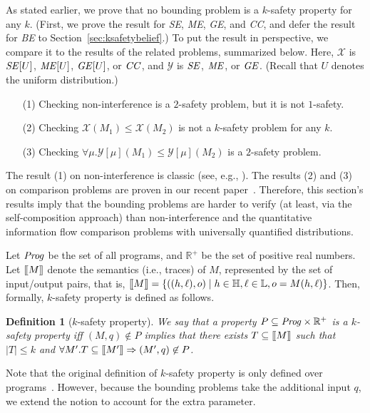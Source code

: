 \documentclass{llncs}
\newtheorem{definition}[theorem]{Definition}
\newcommand{\aset}[1]{\{{#1}\}}
\newcommand{\sembrack}[1]{[\hspace*{-1.2pt}[#1]\hspace*{-1.2pt}]}
\begin{document}
As stated earlier, we prove that no bounding problem is a $k$-safety
property for any $k$.  (First, we prove the result for {\it SE}, {\it
  ME}, {\it GE}, and {\it CC}, and defer the result for {\it BE} to
Section~\ref{sec:ksafetybelief}.)  To put the result in perspective, we
compare it to the results of the related problems, summarized below.
Here, $\mathcal{X}$ is ${\it SE}[U]$, ${\it ME}[U]$, ${\it GE}[U]$, or
${\it CC}$, and $\mathcal{Y}$ is ${\it SE}$, ${\it ME}$, or ${\it
  GE}$.  (Recall that $U$ denotes the uniform distribution.)
\begin{itemize}
\item[(1)] Checking non-interference is a $2$-safety problem, but it is not $1$-safety.
\item[(2)] Checking $\mathcal{X}(M_1) \leq \mathcal{X}(M_2)$ is not a $k$-safety problem for any $k$.
\item[(3)] Checking $\forall \mu.\mathcal{Y}[\mu](M_1) \leq \mathcal{Y}[\mu](M_2)$ is a $2$-safety problem.
\end{itemize}
The result (1) on non-interference is classic (see, e.g.,
\cite{mclean:sp94,barthe:csfw04,darvas:spc05}).  The results (2) and
(3) on comparison problems are proven in our recent
paper~\cite{DBLP:conf/csfw/yasuoka2010}.  Therefore, this section's
results imply that the bounding problems are harder to verify (at
least, via the self-composition approach) than non-interference and
the quantitative information flow comparison problems with universally
quantified distributions.

Let ${\it Prog}$ be the set of all programs, and ${\mathbb R}^+$
  be the set of positive real numbers.  Let $\sembrack{M}$ denote the
  semantics (i.e., traces) of $M$, represented by the set of
  input/output pairs, that is, $\sembrack{M} = \aset{((h,\ell),o) \mid
    h \in \mathbb{H}, \ell \in \mathbb{L}, o = M(h,\ell)}$.  Then,
  formally, $k$-safety property is defined as follows.
\begin{definition}[$k$-safety property]
We say that a property $P \subseteq {\it Prog}\times {\mathbb R}^+$
is a $k$-safety property iff $(M,q)\not\in P$ implies that there exists
$T \subseteq \sembrack{M}$ such that $|T|\le k$ and $\forall
M'. T\subseteq\sembrack{M'}\Rightarrow(M',q)\not\in P$.
\end{definition}
Note that the original definition of $k$-safety property is only
defined over
programs~\cite{terauchi:sas05,DBLP:conf/csfw/ClarksonS08}.  However,
because the bounding problems take the additional input $q$, we extend
the notion to account for the extra parameter.
\end{document}
